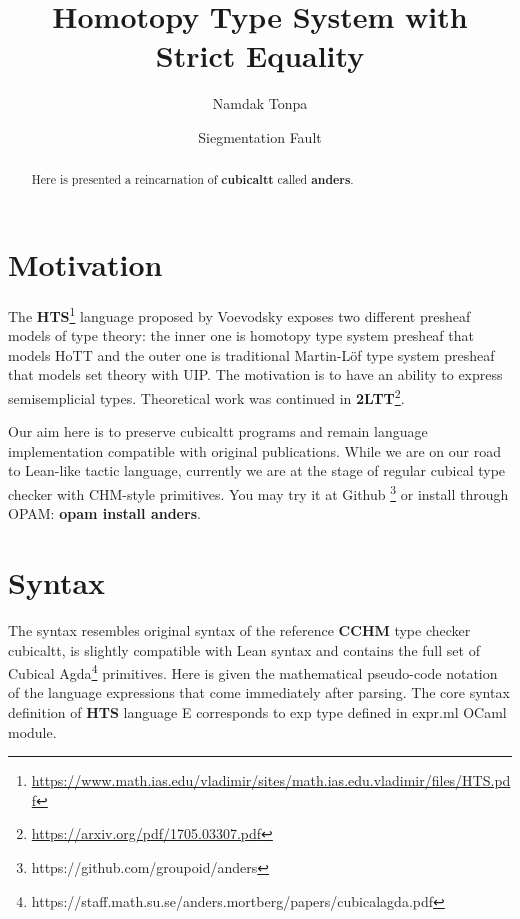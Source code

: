 \documentclass[a4paper,UKenglish,cleveref, autoref, thm-restate]{lipics-v2021}
\title{Homotopy Type System with Strict Equality}
\author{Namdak Tonpa}{Groupoid Infinity}{maxim@synrc.com}{https://orcid.org/0000-0001-7127-8796}{}
\author{Siegmentation Fault}{Groupoid Infinity}{siegmentationfault@yandex.ru}{}{}
\begin{document}
\maketitle

\begin{abstract}
Here is presented a reincarnation of \textbf{cubicaltt} called \textbf{anders}.
\end{abstract}

\section{Motivation}
\label{sec:typesetting-summary}

The \textbf{HTS}\footnote{\url{https://www.math.ias.edu/vladimir/sites/math.ias.edu.vladimir/files/HTS.pdf}}
language proposed by Voevodsky exposes two different presheaf models of type theory:
the inner one is homotopy type system presheaf that models HoTT and the outer one is traditional Martin-Löf
type system presheaf that models set theory with UIP. The motivation is to have an ability to
express semisemplicial types. Theoretical work was continued in \textbf{2LTT}\footnote{\url{https://arxiv.org/pdf/1705.03307.pdf}}.

Our aim here is to preserve cubicaltt programs and remain language implementation compatible with original publications.
While we are on our road to Lean-like tactic language, currently we are at the stage of regular cubical type
checker with CHM-style primitives. You may try it at Github \footnote{https://github.com/groupoid/anders}
or install through OPAM: \textbf{opam install anders}.

\section{Syntax}

The syntax resembles original syntax of the reference \textbf{CCHM} type checker cubicaltt,
is slightly compatible with Lean syntax and contains the full set of Cubical
Agda\footnote{https://staff.math.su.se/anders.mortberg/papers/cubicalagda.pdf} primitives.
Here is given the mathematical pseudo-code notation of the language expressions that come
immediately after parsing. The core syntax definition of \textbf{HTS} language E
corresponds to exp type defined in expr.ml OCaml module.
\end{document}
